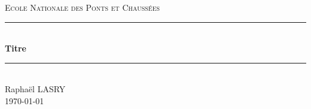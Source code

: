 \documentclass[12pt,titlepage]{report}
\begin{document}
	
	\begin{titlepage}
		\newcommand{\HRule}{\rule{\linewidth}{0.5mm}}
		\center
		\textsc{\LARGE
			Ecole Nationale des Ponts et Chaussées
		} \\[1cm]
		\HRule \\[0.4cm]
		{ \huge \bfseries Titre \\[0.15cm] }
		\HRule \\[1.5cm]
		Raphaël LASRY
		\\[1cm]
		\today \\ [1cm]
	\end{titlepage}
	
\end{document}
